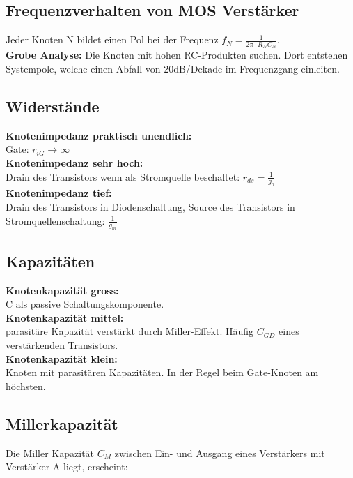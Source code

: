 \begin{multicols}{2}

\section{Frequenzverhalten von MOS Verstärker}
Jeder Knoten N bildet einen Pol bei der Frequenz
$f_N=\frac{1}{2\pi\cdot R_NC_N}$. \\

\textbf{Grobe Analyse:} Die Knoten mit hohen RC-Produkten suchen. Dort entstehen
Systempole, welche einen Abfall von 20dB/Dekade im Frequenzgang einleiten.

\subsection{Widerstände}
	\textbf{Knotenimpedanz praktisch unendlich:} \\ Gate: $r_{iG}\rightarrow\infty$ \\
	\textbf{Knotenimpedanz sehr hoch:} \\ Drain des Transistors wenn
		als Stromquelle beschaltet: $r_{ds}=\frac{1}{g_0}$  \\	
	\textbf{Knotenimpedanz tief:} \\ Drain des Transistors in
		Diodenschaltung, Source des Transistors in Stromquellenschaltung: $\frac{1}{g_m}$  \\
		
\subsection{Kapazitäten}
	\textbf{Knotenkapazität gross:} \\ C als passive Schaltungskomponente. \\
	\textbf{Knotenkapazität mittel:} \\ parasitäre Kapazität verstärkt durch Miller-Effekt.
	Häufig $C_{GD}$ eines verstärkenden Transistors. \\
	\textbf{Knotenkapazität klein:} \\ Knoten mit parasitären Kapazitäten. In der Regel beim
	Gate-Knoten am höchsten. \\

\columnbreak

\subsection{Millerkapazität}
Die Miller Kapazität $C_M$ zwischen Ein- und Ausgang eines Verstärkers mit
Verstärker A liegt, erscheint:\\


\end{multicols}
